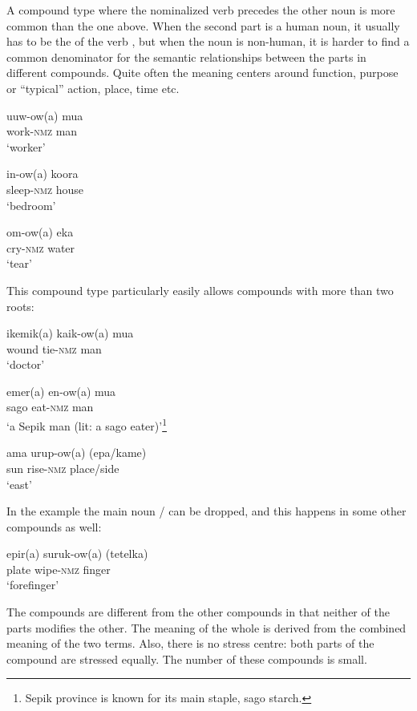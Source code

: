 A compound type where the nominalized verb precedes the other noun is more common than the one above. When the second part is a human noun, it usually has to be the  of the verb , but when the noun is non-human, it is harder to find a common denominator for the semantic relationships between the parts in different compounds. Quite often the meaning centers around function, purpose or ``typical'' action, place, time etc.

\ea%
\label{ex:3:x52}
\gll uuw-ow(a) mua \\
work-\textsc{nmz} man\\
\glt`worker'
\z

\ea%
\label{ex:3:x53}
\gll in-ow(a) koora \\
sleep-\textsc{nmz} house\\
\glt`bedroom'
\z

\ea%
\label{ex:3:x54}
\gll om-ow(a) eka \\
cry-\textsc{nmz} water\\
\glt`tear'
\z

This compound type particularly easily allows compounds with more than two roots: 

\ea%
\label{ex:3:x55}
\gll ikemik(a) kaik-ow(a) mua \\
wound tie-\textsc{nmz} man\\
\glt`doctor'
\z

\ea%
\label{ex:3:x56}
\gll emer(a) en-ow(a) mua \\
sago eat-\textsc{nmz} man\\
\glt`a Sepik man (lit: a sago eater)'\footnote{Sepik province is known for its main staple, sago starch.}
\z 


\ea%
\label{ex:3:x60}
\gll ama urup-ow(a) (epa/kame) \\
sun rise-\textsc{nmz} place/side\\
\glt`east'
\z

In the example  the main noun / can be dropped, and this happens in some other compounds as well:

\ea%
\label{ex:3:x61}
\gll epir(a) suruk-ow(a) (tetelka) \\
plate wipe-\textsc{nmz} finger\\
\glt`forefinger' 
\z  

The  compounds are different from the other compounds in that neither of the parts modifies the other. The meaning of the whole is derived from the combined meaning of the two terms. Also, there is no stress centre: both parts of the compound are stressed equally. The number of these compounds is small.

